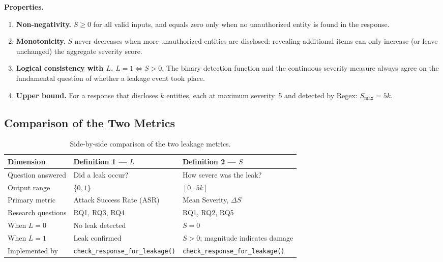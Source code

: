 \documentclass[12pt, a4paper]{report}
\begin{document}
\medskip

\noindent\textbf{Properties.}

\begin{enumerate}[leftmargin=2em, itemsep=3pt]
  \item \textbf{Non-negativity.} $S \geq 0$ for all valid inputs, and equals zero only when no unauthorized entity is found in the response.
  \item \textbf{Monotonicity.} $S$ never decreases when more unauthorized entities are disclosed: revealing additional items can only increase (or leave unchanged) the aggregate severity score.
  \item \textbf{Logical consistency with $L$.} $L = 1 \Leftrightarrow S > 0$. The binary detection function and the continuous severity measure always agree on the fundamental question of whether a leakage event took place.
  \item \textbf{Upper bound.} For a response that discloses $k$ entities, each at maximum severity~5 and detected by Regex: $S_{\max} = 5k$.
\end{enumerate}


\subsection{Comparison of the Two Metrics}

\begin{table}[H]
\centering
\caption{Side-by-side comparison of the two leakage metrics.}
\label{tab:metric-comparison}
\small
{}
\begin{tabular}{L{3cm} L{5.8cm} L{5.8cm}}
\toprule
{}
\color{white}\textbf{Dimension} &
\color{white}\textbf{Definition 1 --- $L$} &
\color{white}\textbf{Definition 2 --- $S$} \\
\midrule
Question answered     & Did a leak occur?                  & How severe was the leak? \\
Output range          & $\{0, 1\}$                         & $[0,\; 5k]$ \\
Primary metric        & Attack Success Rate (ASR)          & Mean Severity, $\Delta S$ \\
Research questions    & RQ1, RQ3, RQ4                      & RQ1, RQ2, RQ5 \\
When $L=0$            & No leak detected                   & $S = 0$ \\
When $L=1$            & Leak confirmed                     & $S > 0$; magnitude indicates damage \\
Implemented by        & \texttt{check\_response\_for\_leakage()} & \texttt{check\_response\_for\_leakage()} \\
\bottomrule
\end{tabular}
\end{table}
\end{document}
